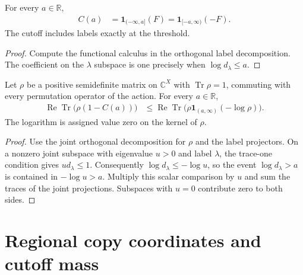 \begin{theorem}
    \label{thm:schur_label_cutoff_spectral}
    \leanok
    For every $a\in\mathbb R$,
    \begin{align*}
        C(a) & =\mathbf1_{(-\infty,a]}(F)
        =\mathbf1_{[-a,\infty)}(-F).
    \end{align*}
    The cutoff includes labels exactly at the threshold.
\end{theorem}
\begin{proof}\leanok
    Compute the functional calculus in the orthogonal label decomposition.
    The coefficient on the $\lambda$ subspace is one precisely when
    $\log d_\lambda\le a$.
\end{proof}

\begin{theorem}
    \label{thm:schur_label_tail_surprisal}
    \leanok
    Let $\rho$ be a positive semidefinite matrix on $\mathbb C^X$ with
    $\operatorname{Tr}\rho=1$, commuting with every permutation operator
    of the action. For every $a\in\mathbb R$,
    \begin{align*}
        \operatorname{Re}\operatorname{Tr}\bigl(\rho(1-C(a))\bigr)
         & \le \operatorname{Re}\operatorname{Tr}\bigl(
        \rho\mathbf1_{(a,\infty)}(-\log\rho)\bigr).
    \end{align*}
    The logarithm is assigned value zero on the kernel of $\rho$.
\end{theorem}
\begin{proof}\leanok
    Use the joint orthogonal decomposition for $\rho$ and the label
    projectors. On a nonzero joint subspace with eigenvalue $u>0$ and label
    $\lambda$, the trace-one condition gives $u d_\lambda\le1$.
    Consequently $\log d_\lambda\le-\log u$, so the event
    $\log d_\lambda>a$ is contained in $-\log u>a$.
    Multiply this scalar comparison by $u$ and sum the traces of the joint
    projections. Subspaces with $u=0$ contribute zero to both sides.
\end{proof}

\section{Regional copy coordinates and cutoff mass}
\label{sec:subsystem_label_coordinates}

